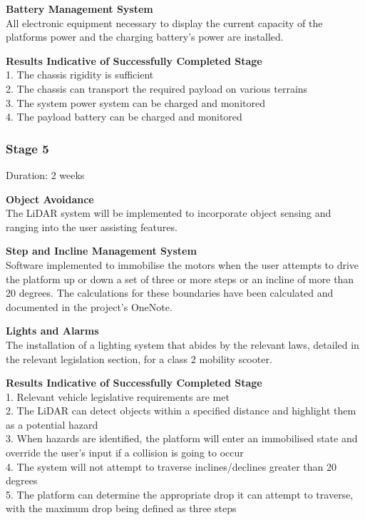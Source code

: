 \documentclass [12pt]{article}
\begin{document}
\textbf{Battery Management System}\\
All electronic equipment necessary to display the current capacity of the platforms power and the charging battery's power are installed.

\textbf{Results Indicative of Successfully Completed Stage}\\
1.	The chassis rigidity is sufficient\\
2.	The chassis can transport the required payload on various terrains\\
3.	The system power system can be charged and monitored\\
4.	The payload battery can be charged and monitored\\

\subsubsection{Stage 5}

Duration: 2 weeks

\textbf{Object Avoidance}\\
The LiDAR system will be implemented to incorporate object sensing and ranging into the user assisting features.

\textbf{Step and Incline Management System}\\
Software implemented to immobilise the motors when the user attempts to drive the platform up or down a set of three or more steps or an incline of more than 20 degrees. The calculations for these boundaries have been calculated and documented in the project’s OneNote.

\textbf{Lights and Alarms}\\
The installation of a lighting system that abides by the relevant laws, detailed in the relevant legislation section, for a class 2 mobility scooter.

\textbf{Results Indicative of Successfully Completed Stage}\\
1.	Relevant vehicle legislative requirements are met\\
2.	The LiDAR can detect objects within a specified distance and highlight them as a potential hazard\\
3.	When hazards are identified, the platform will enter an immobilised state and override the user’s input if a collision is going to occur\\
4.	The system will not attempt to traverse inclines/declines greater than 20 degrees\\
5.	The platform can determine the appropriate drop it can attempt to traverse, with the maximum drop being defined as three steps\\
\end{document}
